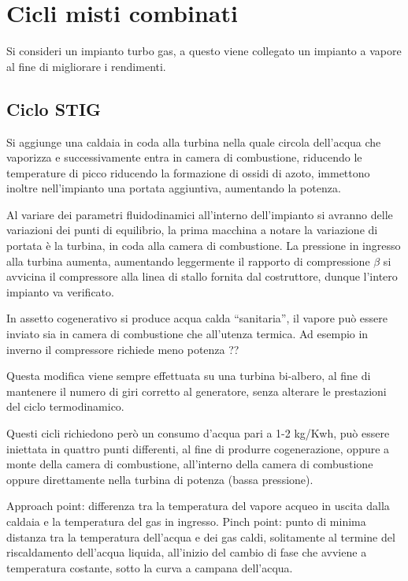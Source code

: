 
\section{Cicli misti combinati}

Si consideri un impianto turbo gas, a questo viene collegato un impianto a
vapore al fine di migliorare i rendimenti.

\subsection{Ciclo STIG}
Si aggiunge una caldaia in coda alla turbina nella quale circola dell'acqua che
vaporizza e successivamente entra in camera di combustione, riducendo le
temperature di picco riducendo la formazione di ossidi di azoto, immettono
inoltre nell'impianto una portata aggiuntiva, aumentando la potenza.

Al variare dei parametri fluidodinamici all'interno dell'impianto si avranno
delle variazioni dei punti di equilibrio, la prima macchina a notare la
variazione di portata è la turbina, in coda alla camera di combustione.
La pressione in ingresso alla turbina aumenta, aumentando leggermente il
rapporto di compressione $\beta$ si avvicina il compressore alla linea di
stallo fornita dal costruttore, dunque l'intero impianto va verificato.

In assetto cogenerativo si produce acqua calda ``sanitaria'', il vapore può
essere inviato sia in camera di combustione che all'utenza termica. Ad esempio
in inverno il compressore richiede meno potenza ??

Questa modifica viene sempre effettuata su una turbina bi-albero, al fine di
mantenere il numero di giri corretto al generatore, senza alterare le
prestazioni del ciclo termodinamico.

Questi cicli richiedono però un consumo d'acqua pari a 1-2 kg/Kwh, può essere
iniettata in quattro punti differenti, al fine di produrre cogenerazione,
oppure a monte della camera di combustione, all'interno della camera di
combustione oppure direttamente nella turbina di potenza (bassa pressione).

Approach point: differenza tra la temperatura del vapore acqueo in uscita dalla
caldaia e la temperatura del gas in ingresso.
Pinch point: punto di minima distanza tra la temperatura dell'acqua e dei gas
caldi, solitamente al termine del riscaldamento dell'acqua liquida, all'inizio
del cambio di fase che avviene a temperatura costante, sotto la curva a campana
dell'acqua.

